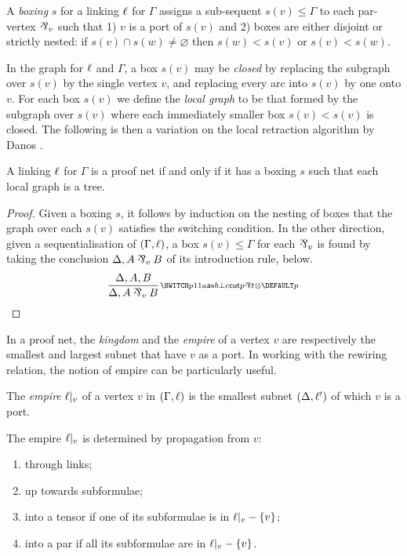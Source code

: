 \documentclass{lmcs}
\begin{document}
\newcommand\bx{s}

\begin{definition}
A \emph{boxing} $\bx$ for a linking $\ell$ for $\Gamma$ assigns a sub-sequent $\bx(v)\leq\Gamma$ to each par-vertex $\named v\pr$ such that 1) $v$ is a port of $\bx(v)$ and 2) boxes are either disjoint or strictly nested: if $\bx(v)\cap\bx(w)\neq\varnothing$ then $\bx(w)<\bx(v)$ or $\bx(v)<\bx(w)$.
\end{definition}

\noindent
In the graph for $\ell$ and $\Gamma$, a box $\bx(v)$ may be \emph{closed} by replacing the subgraph over $\bx(v)$ by the single vertex $v$, and replacing every arc into $\bx(v)$ by one onto $v$. For each box $\bx(v)$ we define the \emph{local graph} to be that formed by the subgraph over $\bx(v)$ where each immediately smaller box $\bx(v)<\bx(v)$ is closed. The following is then a variation on the local retraction algorithm by Danos \cite{Danos-1990}.

\begin{proposition}
\label{prop:scoping correctness}
A linking $\ell$ for $\Gamma$ is a proof net if and only if it has a boxing $\bx$ such that each local graph is a tree.
\end{proposition}

\begin{proof}
Given a boxing $\bx$, it follows by induction on the nesting of boxes that the graph over each $\bx(v)$ satisfies the switching condition. In the other direction, given a sequentialisation of $(\Gamma,\ell)$, a box $\bx(v)\leq\Gamma$ for each $\named v\pr$ is found by taking the conclusion $\Delta, A\named v\pr B$ of its introduction rule, below.
\[
	\infer[\MLLlabel p]{\Delta,A\named v\pr B}{\Delta,A,B}
\]
\end{proof}

In a proof net, the \emph{kingdom} and the \emph{empire} of a vertex $v$ are respectively the smallest and largest subnet that have $v$ as a port. In working with the rewiring relation, the notion of empire can be particularly useful.

\begin{definition}
The \emph{empire} $\emp v$ of a vertex $v$ in $(\Gamma,\ell)$ is the smallest subnet $(\Delta,\ell')$ of which $v$ is a port.
\end{definition}

\begin{proposition}
\label{prop:empire propagation}
The empire $\emp v$ is determined by propagation from $v$:
\begin{enumerate}
	\item\label{case:empire propagation 1} through links;
	\item up towards subformulae;
	\item into a tensor if one of its subformulae is in $\emp v-\{v\}$;
	\item into a par if all its subformulae are in $\emp v-\{v\}$.
\end{enumerate}
\end{proposition}
\end{document}

